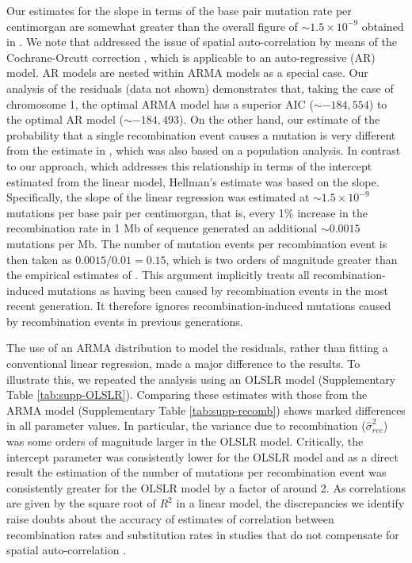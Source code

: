 Our estimates for the slope in terms of the base pair mutation rate per centimorgan are somewhat greater than the overall figure of $\sim1.5\times10^{-9}$ obtained in \citet{Hellmann_2005}. We note that \citet{Hellmann_2005} addressed the issue of spatial auto-correlation by means of the Cochrane-Orcutt correction \citep{kutner2005applied}, which is applicable to an auto-regressive (AR) model. AR models are nested within ARMA models as a special case. Our analysis of the residuals (data not shown) demonstrates that, taking the case of chromosome 1, the optimal ARMA model has a superior AIC ($\sim-184,554$) to the optimal AR model ($\sim-184,493$). On the other hand, our estimate of the probability that a single recombination event causes a mutation is very different from the estimate in  \citet{Hellmann_2005}, which was also based on a population analysis. In contrast to our approach, which addresses this relationship in terms of the intercept estimated from the linear model, Hellman's estimate was based on the slope. Specifically, the slope of the linear regression was estimated at $\sim1.5\times10^{-9}$ mutations per base pair per centimorgan, that is, every 1\% increase in the recombination rate in 1 Mb of sequence generated an additional $\sim0.0015$ mutations per Mb. The number of mutation events per recombination event is then taken as $0.0015/0.01=0.15$, which is two orders of magnitude greater than the empirical estimates of \citet{Arbeithuber_Crossovers_2015}. This argument implicitly treats all recombination-induced mutations as having been caused by recombination events in the most recent generation. It therefore ignores recombination-induced mutations caused by recombination events in previous generations.

The use of an ARMA distribution to model the residuals, rather than fitting a conventional linear regression, made a major difference to the results. To illustrate this, we repeated the analysis using an OLSLR model (Supplementary Table \ref{tab:supp-OLSLR}). Comparing these estimates with those from the ARMA model (Supplementary Table \ref{tab:supp-recomb}) shows marked differences in all parameter values. In particular, the variance due to recombination ($\hat{\sigma }^2_{rec}$) was some orders of magnitude larger in the OLSLR model. Critically, the intercept parameter was consistently lower for the OLSLR model and as a direct result the estimation of the number of mutations per recombination event was consistently greater for the OLSLR model by a factor of around 2. As correlations are given by the square root of $R^2$ in a linear model, the discrepancies we identify raise doubts about the accuracy of estimates of correlation between recombination rates and substitution rates in studies that do not compensate for spatial auto-correlation \citep{Lercher_2002, Duret_2008, mugal2011substitution}.

